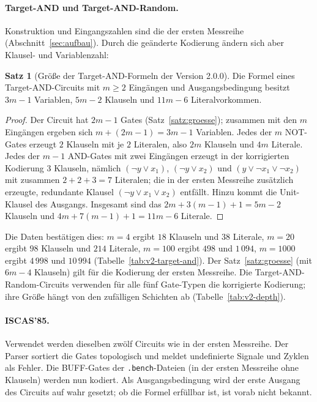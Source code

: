 \documentclass[a4paper,12pt]{article}
\theoremstyle{definition}
\newtheorem{satz}{Satz}
\begin{document}
\paragraph{Target-AND und Target-AND-Random.} Konstruktion und Eingangszahlen sind die der ersten Messreihe (Abschnitt~\ref{sec:aufbau}). Durch die geänderte Kodierung ändern sich aber Klausel- und Variablenzahl:

\begin{satz}[Größe der Target-AND-Formeln der Version 2.0.0]
	\label{satz:groesse2}
	Die Formel eines Target-AND-Circuits mit $m \ge 2$ Eingängen und Ausgangsbedingung besitzt $3m-1$ Variablen, $5m-2$ Klauseln und $11m-6$ Literalvorkommen.
\end{satz}

\begin{proof}
	Der Circuit hat $2m-1$ Gates (Satz~\ref{satz:groesse}); zusammen mit den $m$ Eingängen ergeben sich $m + (2m-1) = 3m-1$ Variablen. Jedes der $m$ NOT-Gates erzeugt $2$ Klauseln mit je $2$ Literalen, also $2m$ Klauseln und $4m$ Literale. Jedes der $m-1$ AND-Gates mit zwei Eingängen erzeugt in der korrigierten Kodierung $3$ Klauseln, nämlich $(\neg y \vee x_1)$, $(\neg y \vee x_2)$ und $(y \vee \neg x_1 \vee \neg x_2)$ mit zusammen $2+2+3 = 7$ Literalen; die in der ersten Messreihe zusätzlich erzeugte, redundante Klausel $(\neg y \vee x_1 \vee x_2)$ entfällt. Hinzu kommt die Unit-Klausel des Ausgangs. Insgesamt sind das $2m + 3(m-1) + 1 = 5m-2$ Klauseln und $4m + 7(m-1) + 1 = 11m-6$ Literale.
\end{proof}

Die Daten bestätigen dies: $m=4$ ergibt $18$ Klauseln und $38$ Literale, $m=20$ ergibt $98$ Klauseln und $214$ Literale, $m=100$ ergibt $498$ und $1\,094$, $m=1000$ ergibt $4\,998$ und $10\,994$ (Tabelle~\ref{tab:v2-target-and}). Der Satz~\ref{satz:groesse} (mit $6m-4$ Klauseln) gilt für die Kodierung der ersten Messreihe. Die Target-AND-Random-Circuits verwenden für alle fünf Gate-Typen die korrigierte Kodierung; ihre Größe hängt von den zufälligen Schichten ab (Tabelle~\ref{tab:v2-depth}).

\paragraph{ISCAS'85.} Verwendet werden dieselben zwölf Circuits wie in der ersten Messreihe. Der Parser sortiert die Gates topologisch und meldet undefinierte Signale und Zyklen als Fehler. Die BUFF-Gates der \texttt{.bench}-Dateien (in der ersten Messreihe ohne Klauseln) werden nun kodiert. Als Ausgangsbedingung wird der erste Ausgang des Circuits auf wahr gesetzt; ob die Formel erfüllbar ist, ist vorab nicht bekannt.
\end{document}
